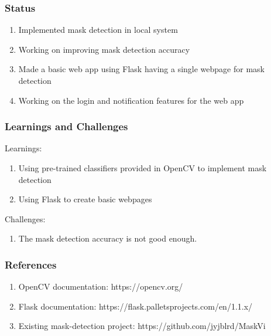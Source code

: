 \documentclass[14pt]{beamer}
\begin{document}
\begin{frame}
    \frametitle{Status}
    \begin{enumerate}
        \item Implemented mask detection in local system
        \item Working on improving mask detection accuracy
        \item Made a basic web app using Flask having a single webpage for mask detection
        \item Working on the login and notification features for the web app
    \end{enumerate}
\end{frame}

\begin{frame}
    \frametitle{Learnings and Challenges}
    Learnings:
    \begin{enumerate}
        \item Using pre-trained classifiers provided in OpenCV to implement mask detection
        \item Using Flask to create basic webpages
    \end{enumerate}
    Challenges:
    \begin{enumerate}
        \item The mask detection accuracy is not good enough.
    \end{enumerate}
\end{frame}

\begin{frame}
    \frametitle{References}
    \begin{enumerate}
        \item OpenCV documentation: https://opencv.org/
        \item Flask documentation: https://flask.palletsprojects.com/en/1.1.x/
        \item Existing mask-detection project: https://github.com/jyjblrd/MaskVi
    \end{enumerate}
\end{frame}
\end{document}
